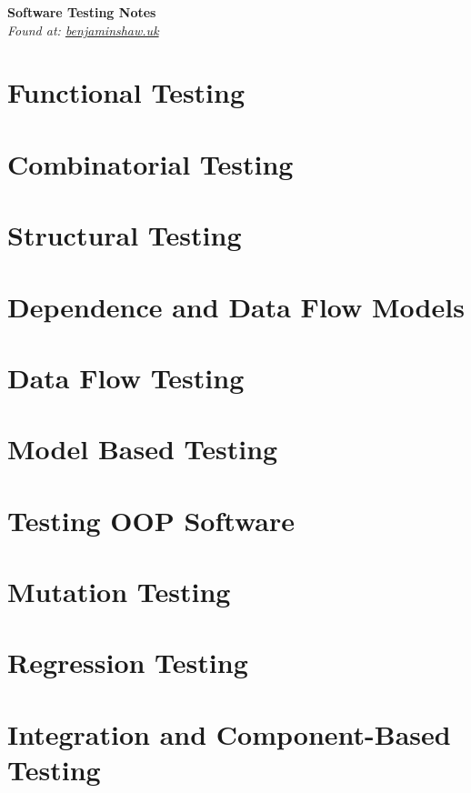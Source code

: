 \documentclass{article}
\begin{document}
\pagestyle{headings}
\textbf{\huge Software Testing Notes}\\
\textit{\footnotesize Found at: \href{http://benjaminshaw.uk}{benjaminshaw.uk}}

\section{Functional Testing}

\section{Combinatorial Testing}

\section{Structural Testing}

\section{Dependence and Data Flow Models}

\section{Data Flow Testing}

\section{Model Based Testing}

\section{Testing OOP Software}

\section{Mutation Testing}

\section{Regression Testing}

\section{Integration and Component-Based Testing}
\end{document}
